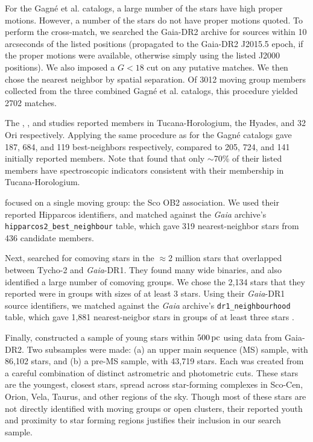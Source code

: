 \documentclass[12pt,twocolumn,tighten]{aastex62}
\begin{document}
For the Gagn\'e et al{.} catalogs, a large
number of the stars have high proper motions.
However, a number of the stars do not have proper motions quoted.
To perform the cross-match,
we searched the Gaia-DR2 archive for
sources within 10 arcseconds of the listed positions (propagated to the
Gaia-DR2 J2015.5 epoch, if the proper motions were available, otherwise
simply using the listed J2000 positions).
We also imposed a $G<18$ cut on any putative matches. 
We then chose the nearest neighbor by spatial separation.
Of 3012 moving group members collected from the
three combined Gagn\'e et al{.}
catalogs, this procedure yielded 2702 matches.

The \citet{kraus_tucanahor_2014}, \citet{roser_deep_2011}, and
\citet{bell_32ori_2017} studies reported members in Tucana-Horologium,
the Hyades, and 32$\,$Ori respectively.  Applying the same procedure as
for the Gagn\'e catalogs gave 187, 684, and 119 best-neighbors
respectively, compared to 205, 724, and 141 initially reported
members.  Note that \citet{kraus_tucanahor_2014} found that only
$\sim$70\% of their listed members have spectroscopic indicators
consistent with their membership in Tucana-Horologium.

\citet{rizzuto_multidimensional_2011} focused on a single moving
group: the Sco OB2 association. We used their reported Hipparcos
identifiers, and matched against the {\it Gaia} archive's
\texttt{hipparcos2\_best\_neighbour} table, which gave 319
nearest-neighbor stars from 436 candidate members.

Next, \citet{oh_comoving_2017} searched for comoving stars in the
$\approx$2 million stars that overlapped between Tycho-2 and {\it
Gaia}-DR1.  They found many wide binaries, and also identified a large
number of comoving groups.  We chose the 2{,}134 stars that they
reported were in groups with sizes of at least 3 stars.  Using their
{\it Gaia}-DR1 source identifiers, we matched against the {\it Gaia}
archive's \texttt{dr1\_neighbourhood} table, which gave 1{,}881
nearest-neigbor stars in groups of at least three stars
\citep{marrese_gaia_2019}.

Finally, \citet{zari_3d_2018} constructed a sample of young stars
within $500\,{\rm pc}$ using data from Gaia-DR2. Two subsamples were
made: (a) an upper main sequence (MS) sample, with 86{,}102 stars, and
(b) a pre-MS sample, with 43{,}719 stars.  Each was created from a
careful combination of distinct astrometric and photometric cuts.
These stars are the youngest, closest stars, spread across
star-forming complexes in Sco-Cen, Orion, Vela, Taurus, and other
regions of the sky.  Though most of these stars are not directly
identified with moving groups or open clusters, their reported
youth and proximity to star
forming regions justifies their inclusion in our search sample.
\end{document}
